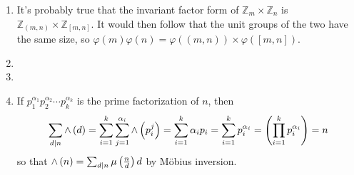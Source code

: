 \documentclass[12pt]{article}
\let\ln\relax\DeclareMathOperator{\ln}{\mathsf{ln}}
\begin{document}
\begin{enumerate}
\item %
It's probably true that
the invariant factor form of $\mathbb{Z}_m\times
\mathbb{Z}_n$ is
$\mathbb{Z}_{\left(m,n\right)}\times
\mathbb{Z}_{\left[m,n\right]}$.
It would then follow that the unit groups of the two
have the same size, so $\varphi\left(m\right)\varphi\left(n\right)
=\varphi\left(\left(m,n\right)\right)\times\varphi\left(
\left[m,n\right]\right)$.

\item %
\item %

\item %
If $p_1^{\alpha_1}p_2^{\alpha_2}\cdots p_k^{\alpha_k}$
is the prime factorization of $n$, then
\[\sum_{d\mid n}\wedge\left(d\right)
=\sum_{i=1}^{k}\sum_{j=1}^{\alpha_i}\wedge\left(p_i^j\right)
=\sum_{i=1}^{k}\alpha_i\ln{p_i}
=\sum_{i=1}^{k}\ln{p_i^{\alpha_i}}
=\ln\left(\prod_{i=1}^{k}p_i^{\alpha_i}\right)
=\ln{n}\]
so that $\wedge\left(n\right)=\sum_{d\mid n}\mu\left(\frac{n}{d}\right)
\ln{d}$ by M\"obius inversion.



\end{enumerate}
\end{document}

